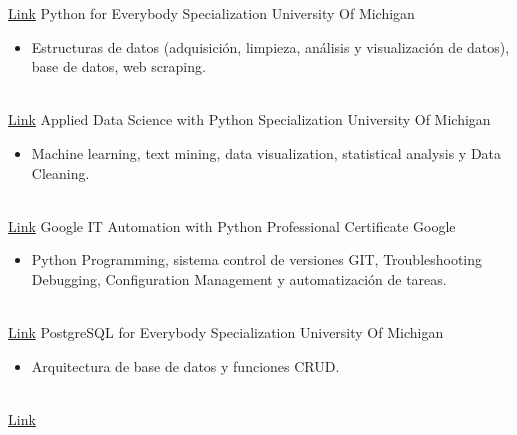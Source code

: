 \documentclass[letterpaper]{DS_class_file} %
\begin{document}
\begin{twenty} %
	\twentyitem
	{\href{https://portfolio-mparraf.herokuapp.com/static/shared/PythonforEverybodySpecialization.pdf}{Link}}
	{}
	{\hspace{0.1cm}Python for Everybody Specialization}
	{University Of Michigan}
	{}
	{
		{\begin{itemize}
				\item Estructuras de datos (adquisición, limpieza, análisis y visualización de datos), base de datos, web scraping. 
		\end{itemize}}
	}
	\\
	\twentyitem
	{\href{https://portfolio-mparraf.herokuapp.com/static/shared/Applied Data Science with Python.pdf}{Link}}
	{}
	{\hspace{0.1cm}Applied Data Science with Python Specialization}
	{University Of Michigan}
	{}
	{
		{\begin{itemize}
				\item Machine learning, text mining, data visualization, statistical analysis  y Data Cleaning.
		\end{itemize}}
	}
	\\
	\twentyitem
	{\href{https://portfolio-mparraf.herokuapp.com/static/shared/Google IT  Automation with Python.pdf}{Link}}
	{}
	{\hspace{0.1cm}Google IT Automation with Python Professional Certificate}
	{Google }
	{}
	{
		{\begin{itemize}
				\item Python Programming, sistema control de versiones GIT, Troubleshooting  Debugging, Configuration Management  y automatización de tareas.
		\end{itemize}}
	}
	\\
	\twentyitem
	{\href{https://portfolio-mparraf.herokuapp.com/static/shared/PostgreSQL for Everybody Specialization.pdf}{Link}}
	{}
	{\hspace{0.1cm}PostgreSQL for Everybody Specialization}
	{University Of Michigan}
	{}
	{
		{\begin{itemize}
				\item Arquitectura de base de datos y funciones CRUD.
		\end{itemize}}
	}
	\\
	\twentyitem
	{\href{https://portfolio-mparraf.herokuapp.com/static/shared/Learn SQL Basics for Data Science Specialization.pdf}{Link}}

\end{twenty}
\end{document}
